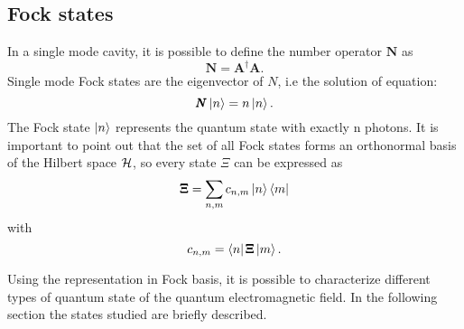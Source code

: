     \subsection{Fock states}
        In a single mode cavity, it is possible to define the number operator $\pmb{N}$ as
        \begin{equation}
            \pmb{N}=\pmb{A}^\dagger \pmb{A}.
        \end{equation}
        Single mode Fock states are the eigenvector of $N$, i.e the solution of equation:
        \begin{equation}
            \pmb{N}\ket{n}=n\ket{n}.
        \end{equation}
        The Fock state $\ket{n}$ represents the quantum state with exactly n photons.
        It is important to point out that the set of all Fock states forms an orthonormal basis
        of the Hilbert space $\mathcal{H}$, so every state $\Xi$ can be expressed as
        \begin{equation}
            \pmb{\Xi} = \sum_{n,m} c_{n,m}\ket{n}\bra{m}
            \label{eq:QEF.4}
        \end{equation}
        with
        \begin{equation*}
            c_{n,m}=\bra{n}\pmb{\Xi}\ket{m}.
        \end{equation*}

        Using the representation in Fock basis, it is possible to characterize different types
        of quantum state of the quantum electromagnetic field. In the following section the 
        states studied are briefly described.